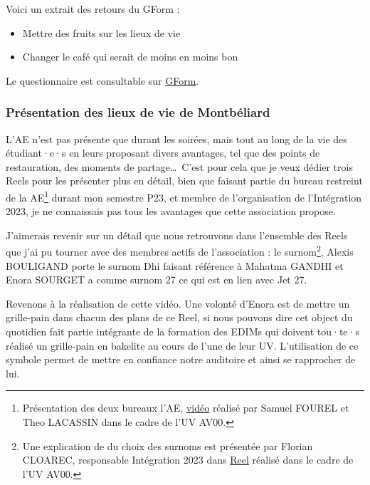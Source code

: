 Voici un extrait des retours du GForm :
\begin{itemize}
    \item Mettre des fruits sur les lieux de vie
    \item Changer le café qui serait de moins en moins bon
\end{itemize}


Le questionnaire est consultable sur \href{https://docs.google.com/forms/d/e/1FAIpQLSfOkOUDseCfWcLwP2uz_amd-i2v_5OucU92uZAUewR6VN_P_A/viewform?usp=sf_link}{GForm}.

\subsubsection{Présentation des lieux de vie de Montbéliard}

L'\gls{AE} n'est pas présente que durant les soirées, mais tout au long de la vie des étudiant·e·s en leurs proposant divers avantages, tel que des points de restauration, des moments de partage\ldots\
C'est pour cela que je veux dédier trois Reels pour les présenter plus en détail, bien que faisant partie du bureau restreint de la \gls{AE}\footnote{Présentation des deux bureaux l'\gls{AE}, \href{https://www.instagram.com/reel/CeT9t0uAxrS/?utm_source=ig_web_copy_link&igshid=MzRlODBiNWFlZA==}{vidéo} réalisé par Samuel FOUREL et Theo LACASSIN dans le cadre de l'UV AV00.} durant mon semestre P23, et membre de l'organisation de l'Intégration 2023, je ne connaissais pas tous les avantages que cette association propose.

J'aimerais revenir sur un détail que nous retrouvons dans l'ensemble des Reels que j'ai pu tourner avec des membres actifs de l'association : le surnom\footnote{Une explication de du choix des surnoms est présentée par Florian CLOAREC, responsable Intégration 2023 dans \href{https://www.instagram.com/reel/Cws1eRdr-wV/?utm_source=ig_web_copy_link&igshid=MzRlODBiNWFlZA==}{Reel} réalisé dans le cadre de l'UV AV00.}, Alexis BOULIGAND porte le surnom Dhi faisant référence à Mahatma GANDHI et Enora SOURGET a comme surnom 27 ce qui est en lien avec Jet 27.

Revenons à la réalisation de cette vidéo.
Une volonté d'Enora est de mettre un grille-pain dans chacun des plans de ce Reel, si nous pouvons dire cet object du quotidien fait partie intégrante de la formation des EDIMs qui doivent tou·te·s réalisé un grille-pain en bakelite au cours de l'une de leur UV.
L'utilisation de ce symbole permet de mettre en confiance notre auditoire et ainsi se rapprocher de lui.

